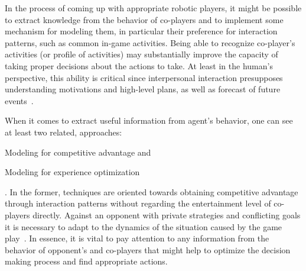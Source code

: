 In the process of coming up with appropriate robotic players, it might be possible to extract knowledge from the behavior of co-players and to implement some mechanism for modeling them, in particular their preference for interaction patterns, such as common in-game activities. %
Being able to recognize co-player's activities (or profile of activities) may substantially improve the capacity of taking proper decisions about the actions to take. At least in the human's perspective, this ability is critical since interpersonal interaction presupposes understanding motivations and high-level plans, as well as forecast of future events~\citep{sukthankar_plan_2014}.

When it comes to extract useful information from agent's behavior, one can see at least two related, approaches: \begin{inparaenum}\item Modeling for competitive advantage and \item Modeling for experience optimization\end{inparaenum}. In the former, techniques are oriented towards obtaining competitive advantage through interaction patterns without regarding the entertainment level of co-players directly. 
Against an opponent with private strategies and conflicting goals it is necessary to adapt to the dynamics of the situation caused by the game play~\citep{rofer_overview_2012}. In essence, it is vital to pay attention to any information from the behavior of opponent's and co-players that might help to optimize the decision making process and find appropriate actions.

